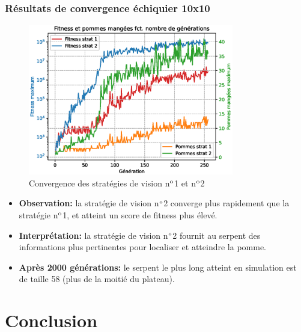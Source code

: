 \documentclass[10pt]{beamer}
\begin{document}
\begin{frame}
\frametitle{Résultats de convergence échiquier 10x10}
\begin{figure}
\vspace{-0.3cm}
\includegraphics[width=0.8\textwidth]{curve_compare_cv.eps}
\vspace{-0.4cm}
\caption*{\tiny Convergence des stratégies de vision n$\textsuperscript{o}$1 et n$\textsuperscript{o}$2}
\end{figure}
\vspace{-0.6cm}
\begin{itemize}
\footnotesize
\item \textbf{Observation:} la stratégie de vision n$\textsuperscript{o}$2 converge plus rapidement que la stratégie n$\textsuperscript{o}$1, et atteint un score de fitness plus élevé.
\item \textbf{Interprétation:} la stratégie de vision n$\textsuperscript{o}$2 fournit au serpent des informations plus pertinentes pour localiser et atteindre la pomme.
\item \textbf{Après 2000 générations:} le serpent le plus long atteint en simulation est de taille 58 (plus de la moitié du plateau).
\end{itemize}

\end{frame}

\section{Conclusion}
\end{document}
